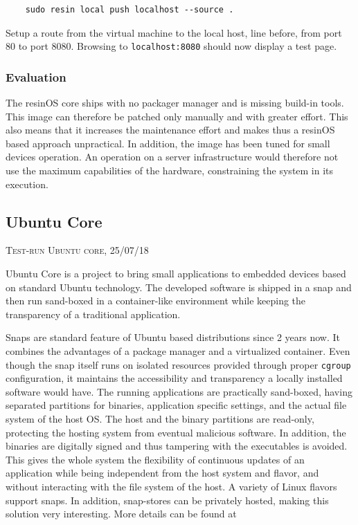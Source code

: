 \documentclass[]{scrartcl}
\begin{document}
\begin{verbatim}
	sudo resin local push localhost --source .
\end{verbatim}

Setup a route from the virtual machine to the local host, line before, from port 80 to port 8080. Browsing to \texttt{localhost:8080} should now display a test page.

\subsubsection{Evaluation}

The resinOS core ships with no packager manager and is missing build-in tools. This image can therefore be patched only manually and with greater effort. This also means that it increases the maintenance effort and makes thus a resinOS based approach unpractical. In addition, the image has been tuned for small devices operation. An operation on a server infrastructure would therefore not use the maximum capabilities of the hardware, constraining the system in its execution.

\subsection{Ubuntu Core}
{\small\textsc{Test-run Ubuntu core, 25/07/18} \bigskip}

Ubuntu Core is a project to bring small applications to embedded devices based on standard Ubuntu technology. The developed software is shipped in a snap and then run sand-boxed in a container-like environment while keeping the transparency of a traditional application. 

Snaps are standard feature of Ubuntu based distributions since 2 years now. It combines the advantages of a package manager and a virtualized container. Even though the snap itself runs on isolated resources provided through proper \texttt{cgroup} configuration, it maintains the accessibility and transparency a locally installed software would have. The running applications are practically sand-boxed, having separated partitions for binaries, application specific settings, and the actual file system of the host OS. The host and the binary partitions are read-only, protecting the hosting system from eventual malicious software. In addition, the binaries are digitally signed and thus tampering with the executables is avoided. This gives the whole system the flexibility of continuous updates of an application while being independent from the host system and flavor, and without interacting with the file system of the host.
A variety of Linux flavors support snaps. In addition, snap-stores can be privately hosted, making this solution very interesting. More details can be found at \cite{snap01}
\end{document}
